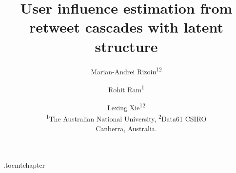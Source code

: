 \documentclass[letterpaper]{article} %
\newcommand{\debate}{{\sc \#DebateNight}\xspace}
\begin{document}
\etocdepthtag.toc{mtchapter}
%
\title{User influence estimation from retweet cascades with latent structure}
\author{
	Marian-Andrei Rizoiu\textsuperscript{1}\textsuperscript{2} 
	\and Rohit Ram\textsuperscript{1}
	\and Lexing Xie\textsuperscript{1}\textsuperscript{2}\\ 
	\textsuperscript{1}The Australian National University,
	\textsuperscript{2}Data61 CSIRO\\
	Canberra, Australia.\\
}

\maketitle

\begin{abstract}
	
\end{abstract}




%
%
%
%
%
%
%
%
%
%
%

{ %
	\fontsize{9.0pt}{10.0pt}
	\selectfont
	
	
}

%
\end{document}
